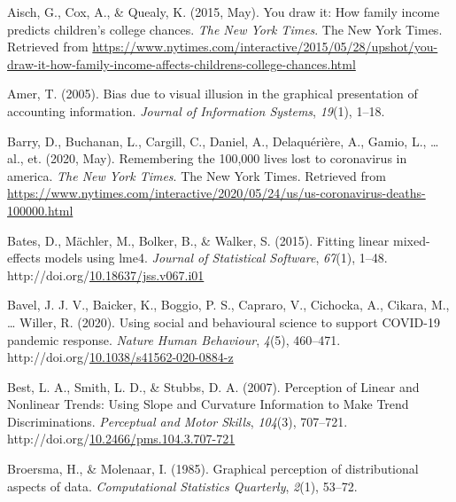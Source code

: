 \documentclass[print]{nuthesis}
\newlength{\cslhangindent}
\newenvironment{CSLReferences}%
{\setlength{\parindent}{0pt}%
\everypar{\setlength{\hangindent}{\cslhangindent}}\ignorespaces}%
{\par}
\begin{document}
\noindent

\setlength{\parindent}{-0.20in}
\setlength{\leftskip}{0.20in}
\setlength{\parskip}{8pt}

\hypertarget{refs}{}
\begin{CSLReferences}{1}{0}
\leavevmode\hypertarget{ref-aisch_cox_quealy_2015}{}%
Aisch, G., Cox, A., \& Quealy, K. (2015, May). You draw it: How family income predicts children's college chances. \emph{The New York Times}. The New York Times. Retrieved from \url{https://www.nytimes.com/interactive/2015/05/28/upshot/you-draw-it-how-family-income-affects-childrens-college-chances.html}

\leavevmode\hypertarget{ref-amer2005bias}{}%
Amer, T. (2005). Bias due to visual illusion in the graphical presentation of accounting information. \emph{Journal of Information Systems}, \emph{19}(1), 1--18.

\leavevmode\hypertarget{ref-NYTrememberinglives}{}%
Barry, D., Buchanan, L., Cargill, C., Daniel, A., Delaquérière, A., Gamio, L., \ldots{} al., et. (2020, May). Remembering the 100,000 lives lost to coronavirus in america. \emph{The New York Times}. The New York Times. Retrieved from \url{https://www.nytimes.com/interactive/2020/05/24/us/us-coronavirus-deaths-100000.html}

\leavevmode\hypertarget{ref-lme4}{}%
Bates, D., Mächler, M., Bolker, B., \& Walker, S. (2015). Fitting linear mixed-effects models using {lme4}. \emph{Journal of Statistical Software}, \emph{67}(1), 1--48. http://doi.org/\href{https://doi.org/10.18637/jss.v067.i01}{10.18637/jss.v067.i01}

\leavevmode\hypertarget{ref-bavel_using_2020}{}%
Bavel, J. J. V., Baicker, K., Boggio, P. S., Capraro, V., Cichocka, A., Cikara, M., \ldots{} Willer, R. (2020). Using social and behavioural science to support {COVID}-19 pandemic response. \emph{Nature Human Behaviour}, \emph{4}(5), 460--471. http://doi.org/\href{https://doi.org/10.1038/s41562-020-0884-z}{10.1038/s41562-020-0884-z}

\leavevmode\hypertarget{ref-best_perception_2007}{}%
Best, L. A., Smith, L. D., \& Stubbs, D. A. (2007). Perception of {Linear} and {Nonlinear} {Trends}: {Using} {Slope} and {Curvature} {Information} to {Make} {Trend} {Discriminations}. \emph{Perceptual and Motor Skills}, \emph{104}(3), 707--721. http://doi.org/\href{https://doi.org/10.2466/pms.104.3.707-721}{10.2466/pms.104.3.707-721}

\leavevmode\hypertarget{ref-broersma1985graphical}{}%
Broersma, H., \& Molenaar, I. (1985). Graphical perception of distributional aspects of data. \emph{Computational Statistics Quarterly}, \emph{2}(1), 53--72.


\end{CSLReferences}
\end{document}

